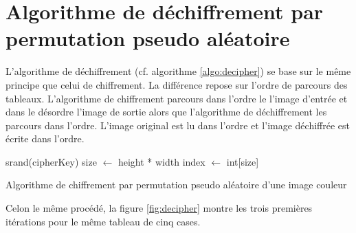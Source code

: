 \documentclass[a4paper]{article}
\begin{document}
    \section{Algorithme de déchiffrement par permutation pseudo aléatoire}

        L'algorithme de déchiffrement (cf. algorithme \ref{algo:decipher}) se base sur le même principe que celui de chiffrement. La différence repose sur l'ordre de parcours des tableaux. L'algorithme de chiffrement parcours dans l'ordre le l'image d'entrée et dans le désordre l'image de sortie alors que l'algorithme de déchiffrement les parcours dans l'ordre. L'image original est lu dans l'ordre et l'image déchiffrée est écrite dans l'ordre.

        \begin{algorithm}[htbp]
            \SetAlgoLined
            srand(cipherKey)\;
            size $\leftarrow$ height * width\;
            index $\leftarrow$ int[size]\;
            \caption{Algorithme de chiffrement par permutation pseudo aléatoire d'une image couleur}
            \label{algo:decipher}
        \end{algorithm}

        Celon le même procédé, la figure \ref{fig:decipher} montre les trois premières itérations pour le même tableau de cinq cases.
\end{document}
